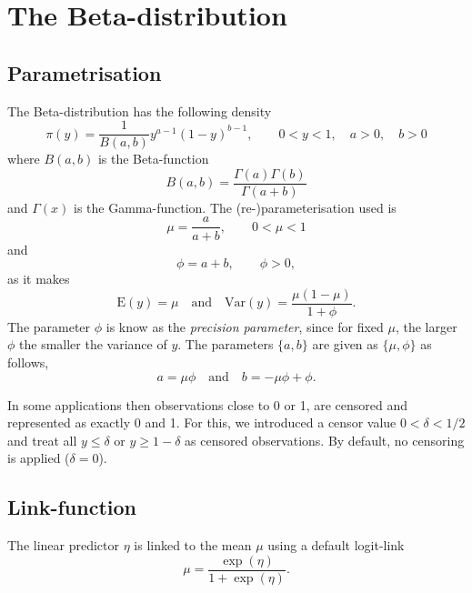 \documentclass[a4paper,11pt]{article}
\begin{document}
\section*{The Beta-distribution}

\subsection*{Parametrisation}

The Beta-distribution has the following density
\begin{displaymath}
    \pi(y) = \frac{1}{B(a, b)} y^{a-1}(1-y)^{b-1}, \qquad 0 < y < 1,
    \quad a>0, \quad b > 0
\end{displaymath}
where $B(a, b)$
is the Beta-function 
\begin{displaymath}
    B(a, b) = \frac{\Gamma(a)\Gamma(b)}{\Gamma(a+b)}
\end{displaymath}
and $\Gamma(x)$ is the Gamma-function.
The (re-)parameterisation used is
\begin{displaymath}
    \mu = \frac{a}{a+b}, \qquad 0 < \mu < 1
\end{displaymath}
and
\begin{displaymath}
    \phi = a + b, \qquad \phi > 0,
\end{displaymath}
as it makes
\begin{displaymath}
    \text{E}(y) = \mu \quad\text{and}\quad \text{Var}(y) = \frac{\mu(1-\mu)}{1+\phi}.
\end{displaymath}
The parameter $\phi$ is know as the \emph{precision parameter}, since
for fixed $\mu$, the larger $\phi$ the smaller the variance of $y$.
The parameters $\{a, b\}$ are given as $\{\mu, \phi\}$ as follows,
\begin{displaymath}
    a = \mu \phi \quad\text{and}\quad  b = -\mu \phi + \phi.
\end{displaymath}

In some applications then observations close to 0 or 1, are censored
and represented as exactly 0 and 1. For this, we introduced a censor
value $0 < \delta<1/2$ and treat all $y \le \delta$ or
$y \ge 1-\delta$ as censored observations. By default, no censoring is
applied ($\delta=0$).


\subsection*{Link-function}

The linear predictor $\eta$ is linked to the mean $\mu$ using a
default logit-link
\begin{displaymath}
    \mu = \frac{\exp(\eta)}{1+\exp(\eta)}.
\end{displaymath}
\end{document}
